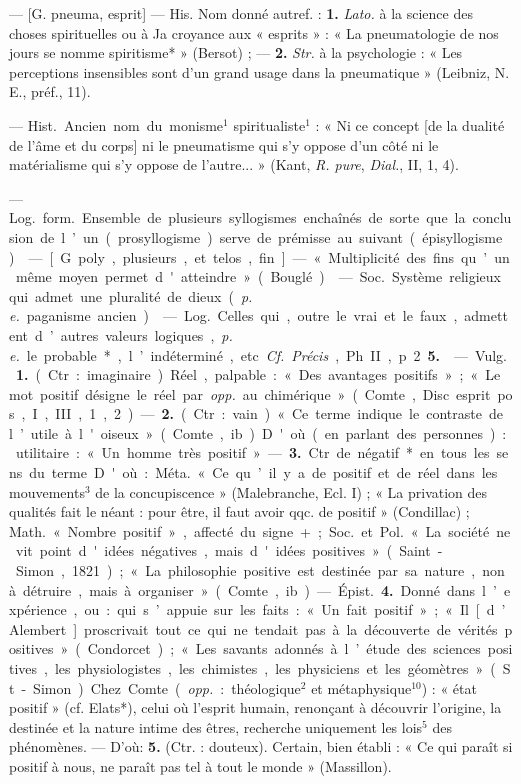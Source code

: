 \begin{itemize}[leftmargin=1cm, label=, itemsep=1pt]
 — [G.
pneuma, esprit] — His. Nom
donné autref. : {\bf 1.} {\it Lato.} à la science
des choses spirituelles ou à Ja
croyance aux « esprits » : « La pneumatologie
de nos jours se nomme
spiritisme* » (Bersot) ; — {\bf 2.} {\it Str.} à
la psychologie : « Les perceptions
insensibles sont d’un grand usage
dans la pneumatique » (Leibniz,
N. E., préf., 11).

 — \si{Hist.} Ancien nom
du monisme$^1$ spiritualiste$^1$ : « Ni ce
concept [de la dualité de l'âme et
du corps] ni le pneumatisme qui s’y
oppose d’un côté ni le matérialisme
qui s’y oppose de l’autre... » (Kant,
{\it R. pure}, {\it Dial.}, II, 1, 4).

 — \si{Log.} \si{form.} Ensemble de plusieurs syllogismes
enchaînés de sorte que la conclusion de l’un (prosyllogisme) serve
de prémisse au suivant (épisyllogisme).

 — [G. poly, plusieurs, et telos,
fin]. — « Multiplicité des fins qu’un
même moyen permet d'atteindre »
(Bouglé).

 — \si{Soc.} Système religieux qui admet une pluralité de
dieux ({\it p. e.} paganisme ancien).

 — \si{Log.} Celles
qui, outre le vrai et le faux, admettent d’autres valeurs logiques, {\it p. e.}
le probable*, l’indéterminé, etc. {\it Cf.}
{\it Précis}, Ph. II, p. 2 {\bf 5.}

 — \si{Vulg.} {\bf 1.} (Ctr. : imaginaire).
Réel, palpable : « Des avantages
positifs » ; « Le mot positif désigne le
réel par {\it opp.} au chimérique » (Comte,
Disc. esprit pos., I, III, 1, 2). —
 {\bf 2.} (Ctr. : vain). « Ce terme indique le
contraste de l’utile à l'oiseux »
(Comte, ib.). D'où (en parlant des
personnes) : utilitaire : « Un homme
très positif. » — {\bf 3.} Ctr. de négatif*
en tous les sens du terme. D'où :
\si{Méta.} « Ce qu’il y a de positif et de réel
dans les mouvements$^3$ de la concupiscence »
(Malebranche, Ecl. I) ; « La
privation des qualités fait le néant :
pour être, il faut avoir qqc. de
positif » (Condillac) ; \si{Math.} « Nombre
positif », affecté du signe +;
\si{Soc.} et \si{Pol.} « La société ne vit point
d'idées négatives, mais d'idées
positives » (Saint-Simon, 1821) ;
« La philosophie positive est destinée
par sa nature, non à détruire,
mais à organiser » (Comte, ib.).

— \si{Épist.} {\bf 4.} Donné dans l’expérience, ou : qui s’appuie sur les faits :
« Un fait positif » ; « Il [d’Alembert]
proscrivait tout ce qui ne tendait
pas à la découverte de vérités positives » (Condorcet) ; « Les savants
adonnés à l’étude des sciences positives, les physiologistes, les chimistes, les physiciens et les géomètres » (St-Simon). Chez Comte
({\it opp.} : théologique$^2$ et métaphysique$^{10}$) : « état positif » (cf. Elats*),
celui où l’esprit humain, renonçant
à découvrir l’origine, la destinée et
la nature intime des êtres, recherche
uniquement les lois$^5$ des phénomènes. — D'où: {\bf 5.} (Ctr. : douteux).
Certain, bien établi : « Ce qui paraît
si positif à nous, ne paraît pas tel à
tout le monde » (Massillon).


\end{itemize}
